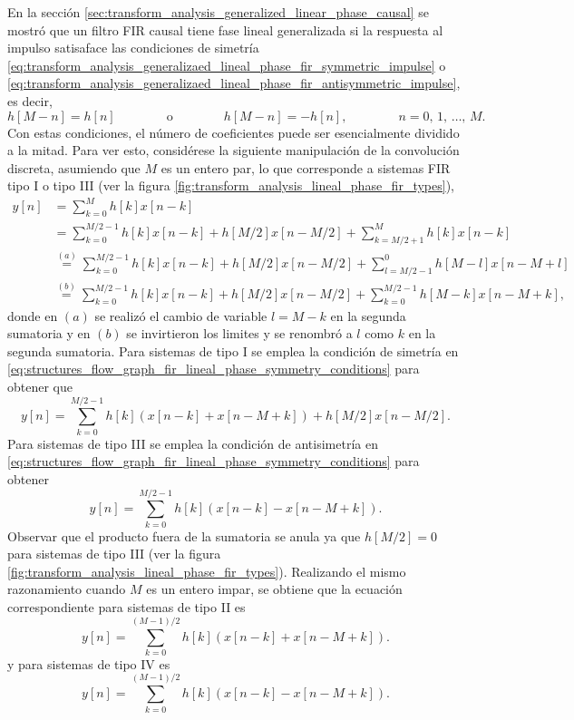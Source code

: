 \documentclass[a4paper]{report}
\begin{document}
En la sección \ref{sec:transform_analysis_generalized_linear_phase_causal} se mostró que un filtro FIR causal tiene fase lineal generalizada si la respuesta al impulso satisaface las condiciones de simetría \ref{eq:transform_analysis_generalizaed_lineal_phase_fir_symmetric_impulse} o \ref{eq:transform_analysis_generalizaed_lineal_phase_fir_antisymmetric_impulse}, es decir,
\begin{equation}\label{eq:structures_flow_graph_fir_lineal_phase_symmetry_conditions}
 h[M-n]=h[n]
 \qquad\qquad
 \textrm{o}
 \qquad\qquad
 h[M-n]=-h[n],
 \qquad\qquad
 n=0,\,1,\,\dots,\,M. 
\end{equation}
Con estas condiciones, el número de coeficientes puede ser esencialmente dividido a la mitad. Para ver esto, considérese la siguiente manipulación de la convolución discreta, asumiendo que \(M\) es un entero par, lo que corresponde a sistemas FIR tipo I o tipo III (ver la figura \ref{fig:transform_analysis_lineal_phase_fir_types}),
\begin{align*}
 y[n]&=\sum_{k=0}^Mh[k]x[n-k]\\
   &=\sum_{k=0}^{M/2-1}h[k]x[n-k]+h[M/2]x[n-M/2]+\sum_{k=M/2+1}^Mh[k]x[n-k]\\
   &\overset{(a)}{=}\sum_{k=0}^{M/2-1}h[k]x[n-k]+h[M/2]x[n-M/2]+\sum_{l=M/2-1}^0h[M-l]x[n-M+l]\\
   &\overset{(b)}{=}\sum_{k=0}^{M/2-1}h[k]x[n-k]+h[M/2]x[n-M/2]+\sum_{k=0}^{M/2-1}h[M-k]x[n-M+k],
\end{align*}
donde en \((a)\) se realizó el cambio de variable \(l=M-k\) en la segunda sumatoria y en \((b)\) se invirtieron los limites y se renombró a \(l\) como \(k\) en la segunda sumatoria. Para sistemas de tipo I se emplea la condición de simetría en \ref{eq:structures_flow_graph_fir_lineal_phase_symmetry_conditions} para obtener que 
\begin{equation}\label{eq:structures_flow_graph_fir_lineal_phase_difference_eq_type_I}
 y[n]=\sum_{k=0}^{M/2-1}h[k](x[n-k]+x[n-M+k])+h[M/2]x[n-M/2].
\end{equation}
Para sistemas de tipo III se emplea la condición de antisimetría en \ref{eq:structures_flow_graph_fir_lineal_phase_symmetry_conditions} para obtener
\begin{equation}\label{eq:structures_flow_graph_fir_lineal_phase_difference_eq_type_III}
 y[n]=\sum_{k=0}^{M/2-1}h[k](x[n-k]-x[n-M+k]).
\end{equation}
Observar que el producto fuera de la sumatoria se anula ya que \(h[M/2]=0\) para sistemas de tipo III (ver la figura \ref{fig:transform_analysis_lineal_phase_fir_types}).
Realizando el mismo razonamiento cuando \(M\) es un entero impar, se obtiene que la ecuación correspondiente para sistemas de tipo II es 
\begin{equation}\label{eq:structures_flow_graph_fir_lineal_phase_difference_eq_type_II}
 y[n]=\sum_{k=0}^{(M-1)/2}h[k](x[n-k]+x[n-M+k]).
\end{equation}
y para  sistemas de tipo IV es
\begin{equation}\label{eq:structures_flow_graph_fir_lineal_phase_difference_eq_type_IV}
 y[n]=\sum_{k=0}^{(M-1)/2}h[k](x[n-k]-x[n-M+k]).
\end{equation}
\end{document}
